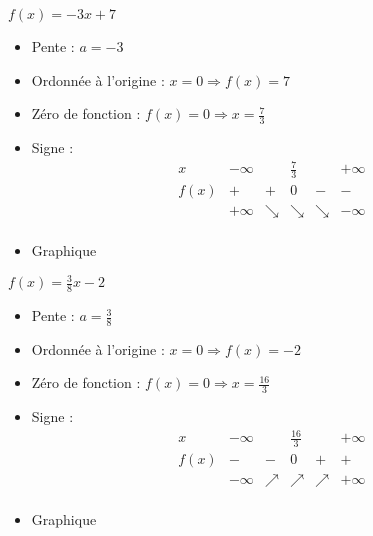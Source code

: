 \begin{solution}
$f(x)=-3x+7$
\begin{itemize}
\item Pente :	$a=-3$
\item Ordonnée à l’origine :	$x=0\Rightarrow f(x)=7$
\item Zéro de fonction :	$f(x)=0\Rightarrow x=\frac{7}{3}$
\item Signe :
$$\begin{array}{l|l|l|l|l|l}
x    & -\infty &   & \frac{7}{3} &   & +\infty \\
\hline
f(x) & +       & + & 0  & - & -   \\
 & +\infty & \searrow & \searrow & \searrow & -\infty \\   
\end{array}$$
\item Graphique
\end{itemize}
\end{solution}

\begin{solution}
$f(x)=\frac{3}{8}x-2$
\begin{itemize}
\item Pente :	$a=\frac{3}{8}$
\item Ordonnée à l’origine :	$x=0\Rightarrow f(x)=-2$ 
\item Zéro de fonction :	$f(x)=0\Rightarrow x=\frac{16}{3}$
\item Signe :	
$$\begin{array}{l|l|l|l|l|l}
x    & -\infty &   & \frac{16}{3} &   & +\infty \\
\hline
f(x) & -       & - & 0  & + & +   \\
 & -\infty & \nearrow & \nearrow & \nearrow & +\infty \\   
\end{array}$$
\item Graphique
\end{itemize}
\end{solution}

